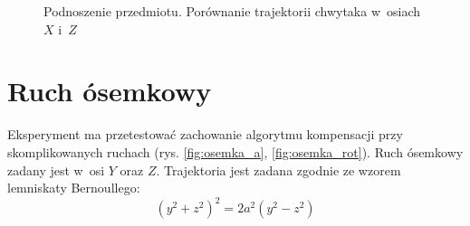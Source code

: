 \begin{figure}[H]
	\centering
	\hfill
	\caption{Podnoszenie przedmiotu. Porównanie trajektorii chwytaka w~osiach $X$ i~$Z$}
	\label{fig:podn_porow_przedm_bok}
\end{figure}





\section{Ruch ósemkowy}
Eksperyment ma przetestować zachowanie algorytmu kompensacji przy skomplikowanych ruchach (rys. \ref{fig:osemka_a}, \ref{fig:osemka_rot}).  Ruch ósemkowy zadany jest w~osi $Y$ oraz $Z$.
Trajektoria jest zadana zgodnie ze wzorem lemniskaty Bernoullego:
\begin{equation}
(y^2 + z^2)^2 = 2a^2(y^2-z^2)
\end{equation}

